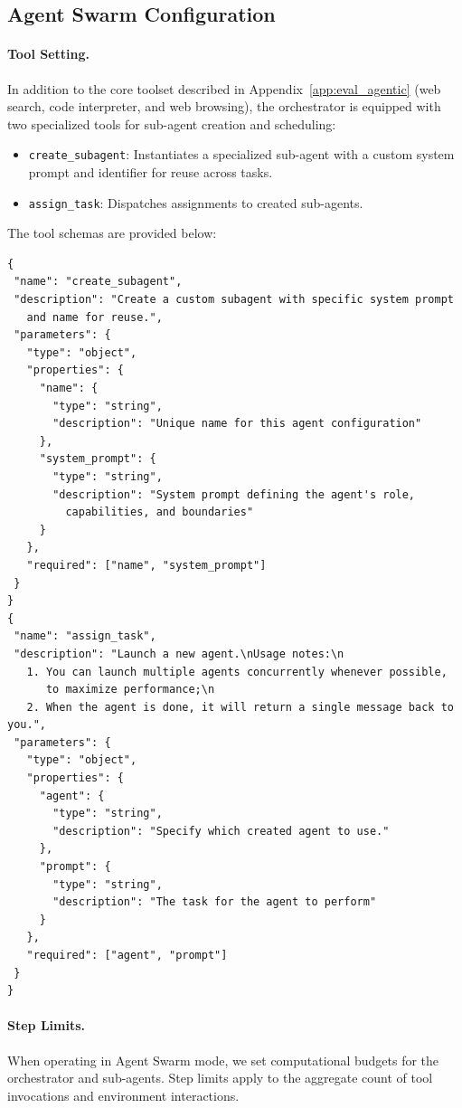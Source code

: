 \documentclass{article}
\begin{document}
\subsection{Agent Swarm Configuration}
\label{app:eval_swarm}
\paragraph{Tool Setting.} In addition to the core toolset described in Appendix~\ref{app:eval_agentic} (web search, code interpreter, and web browsing), the orchestrator is equipped with two specialized tools for sub-agent creation and scheduling:

\begin{itemize}
    \item \texttt{create\_subagent}: Instantiates a specialized sub-agent with a custom system prompt and identifier for reuse across tasks.
    \item \texttt{assign\_task}: Dispatches assignments to created sub-agents.
\end{itemize}

The tool schemas are provided below:

{
\small
\begin{verbatim}
{
 "name": "create_subagent",
 "description": "Create a custom subagent with specific system prompt 
   and name for reuse.",
 "parameters": {
   "type": "object",
   "properties": {
     "name": {
       "type": "string",
       "description": "Unique name for this agent configuration"
     },
     "system_prompt": {
       "type": "string",
       "description": "System prompt defining the agent's role, 
         capabilities, and boundaries"
     }
   },
   "required": ["name", "system_prompt"]
 }
}
{
 "name": "assign_task",
 "description": "Launch a new agent.\nUsage notes:\n
   1. You can launch multiple agents concurrently whenever possible,
      to maximize performance;\n
   2. When the agent is done, it will return a single message back to you.",
 "parameters": {
   "type": "object",
   "properties": {
     "agent": {
       "type": "string",
       "description": "Specify which created agent to use."
     },
     "prompt": {
       "type": "string",
       "description": "The task for the agent to perform"
     }
   },
   "required": ["agent", "prompt"]
 }
}
\end{verbatim}
}

\paragraph{Step Limits.} When operating in Agent Swarm mode, we set computational budgets for the orchestrator and sub-agents. Step limits apply to the aggregate count of tool invocations and environment interactions.
\end{document}
